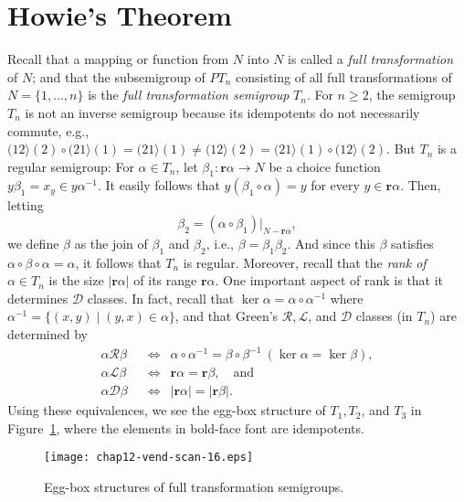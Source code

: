 \documentclass{surv-l}
\numberwithin{equation}{section}
\numberwithin{table}{section}
\numberwithin{figure}{section}
\theoremstyle{definition}
\begin{document}
\section{Howie's Theorem}\label{sec12.60}

Recall that a mapping or function from $N$ into $N$ is called a
\emph{full transformation} of
$N$; and that the subsemigroup of $PT_{n}$ consisting of all full
transformations of $N=\{1,\ldots, n\}$ is the \emph{full
transformation semigroup} $T_{n}$. For $n\geq 2$, the semigroup
$T_{n}$ is not an inverse semigroup because its idempotents do not
necessarily commute, e.g.,
$(12\rangle(2)\circ (21\rangle(1)=(21\rangle(1)\neq(12\rangle(2)=(21\rangle(1)\circ
(12\rangle(2)$. But $T_{n}$ is a regular semigroup: For $\alpha\in
T_{n}$, let $\beta_{1} : \mathbf{r}\alpha\rightarrow N$ be a
choice function $y\beta_{1}=x_{y}\in y\alpha^{-1}$. It easily
follows that $y(\beta_{1}\circ\alpha)=y$ for every $y\in
\mathbf{r}\alpha$. Then, letting
\[
\beta_{2}=(\alpha \circ\beta_{1})|_{N-\mathbf{r}\alpha},
\]
we define $\beta$ as the join of $\beta_{1}$ and $\beta_{2}$,
i.e., $\beta=\beta_{1}\beta_{2}$. And since this $\beta$ satisfies
$\alpha\circ\beta \circ\alpha=\alpha$, it follows that $T_{n}$ is
regular. Moreover, recall that the \emph{rank of} $\alpha\in
T_{n}$ is the size $|\mathbf{r}\alpha|$ of its range
$\mathbf{r}\alpha$. One important aspect of rank is that it
determines $\mathcal{D}$ classes. In fact, recall that
$\ker \alpha=\alpha \circ\alpha^{-1}$ where
$\alpha^{-1}=\{(x, y)\mid (y,x)\in\alpha\}$, and that Green's
$\mathcal{R}, \mathcal{L}$, and $\mathcal{D}$ classes (in $T_{n}$)
are determined by
\begin{align*}
\alpha \mathcal{R}\beta\enspace &\Leftrightarrow\enspace \alpha\circ\alpha^{-1}=\beta\circ\beta^{-1}\ (\ker \alpha=\ker \beta), \\
\alpha \mathcal{L}\beta\enspace &\Leftrightarrow\enspace \mathbf{r}\alpha=\mathbf{r}\beta,\quad \mathrm{and} \\
\alpha \mathcal{D}\beta\enspace &\Leftrightarrow\enspace |\mathbf{r}\alpha|=|\mathbf{r}\beta|.
\end{align*}
Using these equivalences, we see the egg-box structure of $T_{1},
T_{2}$, and $T_{3}$ in Figure~\ref{fig12.60.1}, where the elements
in bold-face font are idempotents.

\begin{figure}[!h]
\texttt{[image: chap12-vend-scan-16.eps]}
\caption{Egg-box structures of full transformation semigroups.\label{fig12.60.1}}
\end{figure}
\end{document}
